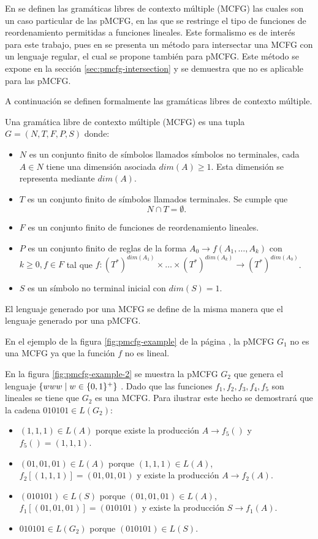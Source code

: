 En \cite{Seki1991OnMC} se definen las gramáticas libres de contexto múltiple (MCFG) las cuales son un caso particular de las pMCFG, en las que se restringe el tipo de funciones de reordenamiento permitidas a funciones lineales. Este formalismo es de interés para este trabajo, pues en \cite{Seki1991OnMC} se presenta un método para intersectar una MCFG con un lenguaje regular, el cual se propone también para pMCFG. Este método se expone en la sección \ref{sec:pmcfg-intersection} y se demuestra que no es aplicable para las pMCFG.

A continuación se definen formalmente las gramáticas libres de contexto múltiple.

\begin{definition}
    Una gramática libre de contexto múltiple (MCFG) es una tupla $G = (N, T, F, P, S)$ donde:
    \begin{itemize}
        \item $N$ es un conjunto finito de símbolos llamados símbolos no terminales, cada $A \in N$ tiene una dimensión asociada $dim(A) \geq 1$. Esta dimensión se representa mediante $dim(A)$.
        \item $T$ es un conjunto finito de símbolos llamados terminales. Se cumple que
              $$
                  N \cap T = \emptyset.
              $$
        \item $F$ es un conjunto finito de funciones de reordenamiento lineales.
        \item $P$ es un conjunto finito de reglas de la forma $A_0 \to f(A_1, \ldots, A_k)$ con $k \geq 0, f \in F$ tal que $f: (T^*)^{dim(A_1)} \times \ldots \times (T^*)^{dim(A_k)} \to (T^*)^{dim(A_0)}$.
        \item $S$ es un símbolo no terminal inicial con $dim(S) = 1$.
    \end{itemize}
    El lenguaje generado por una MCFG se define de la misma manera que el lenguaje generado por una pMCFG.
\end{definition}

En el ejemplo de la figura \ref{fig:pmcfg-example} de la página \pageref{fig:pmcfg-example}, la pMCFG $G_1$ no es una MCFG ya que la función $f$ no es lineal.

En la figura \ref{fig:pmcfg-example-2} se muestra la pMCFG $G_2$ que genera el lenguaje $\{www \;|\; w \in \{0, 1\}^+\}$ \cite{ParsingBeyCFG}. Dado que las funciones $f_1, f_2, f_3, f_4, f_5$ son lineales se tiene que $G_2$ es una MCFG. Para ilustrar este hecho se demostrará que la cadena $010101 \in L(G_2)$:
\begin{itemize}
    \item $(1, 1, 1) \in L(A)$ porque existe la producción $A \to f_5()$ y $f_5() = (1, 1, 1)$.
    \item $(01, 01, 01) \in L(A)$ porque $(1, 1, 1) \in L(A)$, $f_2[(1, 1, 1)] = (01, 01, 01)$ y existe la producción $A \to f_2(A)$.
    \item $(010101) \in L(S)$ porque $(01, 01, 01) \in L(A)$, $f_1[(01, 01, 01)] = (010101)$ y existe la producción $S \to f_1(A)$.
    \item $010101 \in L(G_2)$ porque $(010101) \in L(S)$.
\end{itemize}

